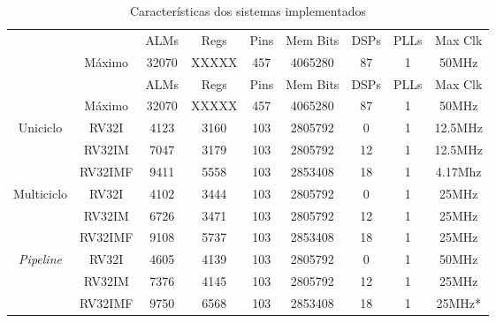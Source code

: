     \begin{longtable}{cc|c|c|c|c|c|c|c|}
        \caption{Características dos sistemas implementados}\label{table:synth_resources}\\
        \cline{3-9}
                                                                &                               & ALMs  & Regs  & Pins  & Mem Bits  & DSPs  & PLLs  & Max Clk   \\
        \cline{2-9}
                                                                & \multicolumn{1}{|c|}{Máximo}  & 32070 & XXXXX & 457   & 4065280   & 87    & 1     & 50MHz     \\
        \hline
        \endfirsthead
        \cline{3-9}
                                                                &                               & ALMs  & Regs  & Pins  & Mem Bits  & DSPs  & PLLs  & Max Clk   \\
        \cline{2-9}
                                                                & \multicolumn{1}{|c|}{Máximo}  & 32070 & XXXXX & 457   & 4065280   & 87    & 1     & 50MHz     \\
        \hline
        \endhead
        \multicolumn{1}{|c}{\multirow{3}{*}{{Uniciclo}}}        & \multicolumn{1}{|c|}{RV32I}   & 4123  & 3160  & 103   & 2805792   & 0     & 1     & 12.5MHz   \\*
        \cline{2-9}
        \multicolumn{1}{|c}{ }                                  & \multicolumn{1}{|c|}{RV32IM}  & 7047  & 3179  & 103   & 2805792   & 12    & 1     & 12.5MHz   \\*
        \cline{2-9}
        \multicolumn{1}{|c}{ }                                  & \multicolumn{1}{|c|}{RV32IMF} & 9411  & 5558  & 103   & 2853408   & 18    & 1     & 4.17Mhz   \\
        \hline
        \multicolumn{1}{|c}{\multirow{3}{*}{{Multiciclo}}}      & \multicolumn{1}{|c|}{RV32I}   & 4102  & 3444  & 103   & 2805792   & 0     & 1     & 25MHz     \\*
        \cline{2-9}
        \multicolumn{1}{|c}{ }                                  & \multicolumn{1}{|c|}{RV32IM}  & 6726  & 3471  & 103   & 2805792   & 12    & 1     & 25MHz     \\*
        \cline{2-9}
        \multicolumn{1}{|c}{ }                                  & \multicolumn{1}{|c|}{RV32IMF} & 9108  & 5737  & 103   & 2853408   & 18    & 1     & 25MHz     \\
        \hline
        \multicolumn{1}{|c}{\multirow{3}{*}{\textit{Pipeline}}} & \multicolumn{1}{|c|}{RV32I}   & 4605  & 4139  & 103   & 2805792   & 0     & 1     & 50MHz     \\*
        \cline{2-9}
        \multicolumn{1}{|c}{ }                                  & \multicolumn{1}{|c|}{RV32IM}  & 7376  & 4145  & 103   & 2805792   & 12    & 1     & 25MHz     \\*
        \cline{2-9}
        \multicolumn{1}{|c}{ }                                  & \multicolumn{1}{|c|}{RV32IMF} & 9750  & 6568  & 103   & 2853408   & 18    & 1     & 25MHz*    \\
        \hline
    \end{longtable}

